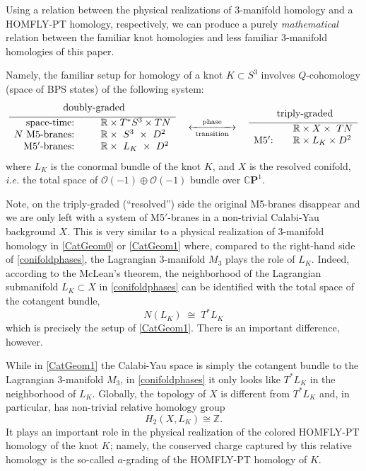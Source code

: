 \documentclass[hyper,letterpaper]{JHEP3}
\newcommand{\be}{\begin{equation}}
\newcommand{\ee}{\end{equation}}
\newcommand{\Z}{{\mathbb Z}}
\newcommand{\R}{{\mathbb R}}
\newcommand{\cp}{{\mathbb{C}}{\mathbf{P}}}
\def\CO{{\mathcal O}}
\begin{document}
Using a relation between the physical realizations of 3-manifold homology and a HOMFLY-PT homology,
respectively, we can produce a purely {\it mathematical} relation between the familiar knot homologies
and less familiar 3-manifold homologies of this paper.

Namely, the familiar setup for homology of a knot $K\subset S^3$ involves $Q$-cohomology (space of BPS states) of the following system:
\be
\begin{array}{rcl}
\multicolumn{3}{c}{~~\text{doubly-graded}~} \\[.1cm]
\hline
{\mbox{\rm space-time:}} && ~~  \R \times T^* S^3 \times TN \\
{\mbox{\rm $N$ M5-branes:}} && ~~  \R \times ~S^3~ \times ~D^2 \\
{\mbox{\rm M5$'$-branes:}} && ~~  \R \times ~L_K~ \times  ~D^2
\end{array}
\quad \xleftarrow[~\text{transition}]{~\text{phase}} \!\!\! \to \quad
%
\begin{array}{rcl}
\multicolumn{3}{c}{~~~\text{triply-graded}~~} \\[.1cm]
\hline
&& \R \times X \times  ~TN \\
{\mbox{\rm M5$'$:}} && \R \times L_K \times  D^2
\end{array}
\label{conifoldphases}
\ee
where $L_K$ is the conormal bundle of the knot $K$,
and $X$ is the resolved conifold, {\it i.e.} the total space of $\CO (-1) \oplus \CO (-1)$ bundle over $\cp^1$.

Note, on the triply-graded (``resolved'') side the original M5-branes disappear
and we are only left with a system of M5$'$-branes in a non-trivial Calabi-Yau background $X$.
This is very similar to a physical realization of 3-manifold homology in \eqref{CatGeom0} or \eqref{CatGeom1}
where, compared to the right-hand side of \eqref{conifoldphases}, the Lagrangian 3-manifold $M_3$
plays the role of $L_K$.
Indeed, according to the McLean's theorem, the neighborhood of the Lagrangian submanifold $L_K \subset X$
in \eqref{conifoldphases} can be identified with the total space of the cotangent bundle,
\be
N (L_K) \; \cong \; T^* L_K
\ee
which is precisely the setup of \eqref{CatGeom1}.
There is an important difference, however.

While in \eqref{CatGeom1} the Calabi-Yau space is simply the cotangent bundle to the Lagrangian 3-manifold $M_3$,
in \eqref{conifoldphases} it only looks like $T^* L_K$ in the neighborhood of $L_K$.
Globally, the topology of $X$ is different from $T^* L_K$ and, in particular, has non-trivial relative homology group
\be
H_2 (X,L_K) \cong \Z.
\ee
It plays an important role in the physical realization of the colored HOMFLY-PT homology of the knot $K$;
namely, the conserved charge captured by this relative homology is the so-called $a$-grading of the HOMFLY-PT homology of $K$.
\end{document}
